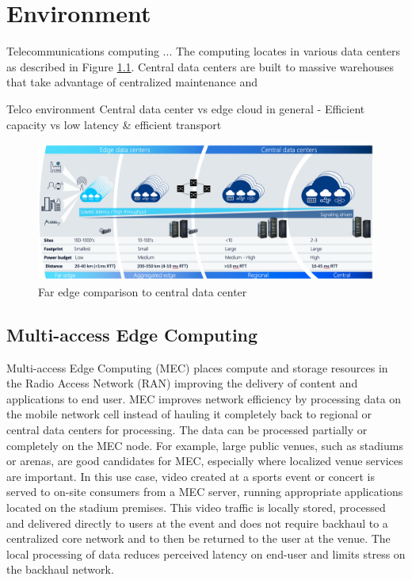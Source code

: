 \chapter{Environment}
\label{chapter:environment}

Telecommunications computing ... The computing locates in various data centers as described in Figure \ref{fig:AirFrame}. Central data centers are built to massive warehouses that take advantage of centralized maintenance and 

Telco environment
Central data center vs edge cloud in general
    - Efficient capacity vs low latency \& efficient transport


\begin{figure}[ht]
  \begin{center}
    \includegraphics[width=13.5cm]{images/AirFrame.png}
    \caption{Far edge comparison to central data center \cite{AirFrameOpenEdgeServer}}
    \label{fig:AirFrame}
  \end{center}
\end{figure}

\section{Multi-access Edge Computing}

Multi-access Edge Computing (MEC) places compute and storage resources in the Radio Access Network (RAN) improving the delivery of content and applications to end user. MEC improves network efficiency by processing data on the mobile network cell instead of hauling it completely back to regional or central data centers for processing. The data can be processed partially or completely on the MEC node. For example, large public venues, such as stadiums or arenas, are good candidates for MEC, especially where localized venue services are important. In this use case, video created at a sports event or concert is served to on-site consumers from a MEC server, running appropriate applications located on the stadium premises. This video traffic is locally stored, processed and delivered directly to users at the event and does not require backhaul to a centralized core network and to then be returned to the user at the venue. The local processing of data reduces perceived latency on end-user and limits stress on the backhaul network. \cite{Brown2016}

